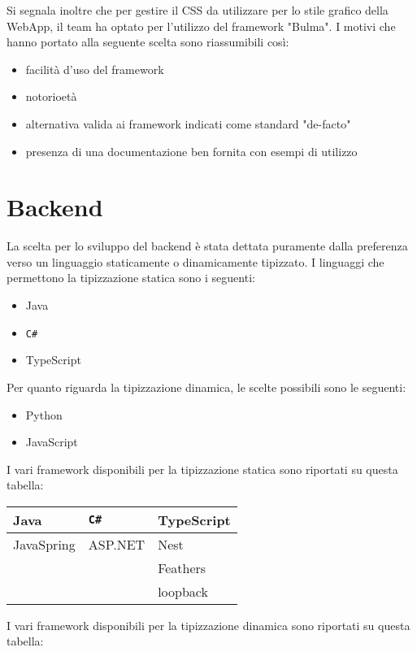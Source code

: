 \documentclass[12pt]{article}
\begin{document}
Si segnala inoltre che per gestire il CSS da utilizzare per lo stile grafico della WebApp, il team ha optato per l'utilizzo del framework "Bulma". I motivi che hanno portato alla seguente scelta sono riassumibili così:
\begin{itemize}
    \item  facilità d'uso del framework
    \item  notorioetà
    \item  alternativa valida ai framework indicati come standard "de-facto"
    \item  presenza di una documentazione ben fornita con esempi di utilizzo
\end{itemize} 
\section{Backend}
La scelta per lo sviluppo del backend è stata dettata puramente dalla preferenza verso un linguaggio staticamente o dinamicamente tipizzato.
I linguaggi che permettono la tipizzazione statica sono i seguenti:
\begin{itemize}
	\item Java
	\item \texttt{C\#}
	\item TypeScript
\end{itemize}
Per quanto riguarda la tipizzazione dinamica, le scelte possibili sono le seguenti:
\begin{itemize}
	\item Python
	\item JavaScript
\end{itemize}

I vari framework disponibili per la tipizzazione statica sono riportati su questa tabella: \\
\begin{center}
\begin{tabular}{ |p{4cm}|p{4cm}| p{4cm} | }
	\hline
	 \textbf{Java} & \texttt{C\#} & \textbf{TypeScript}\\ 
	 \hline
	 JavaSpring & ASP.NET & Nest \\  
	 \hline
 	& & Feathers\\ 
	 \hline
	 & & loopback\\
	 \hline
\end{tabular}
\end{center}

I vari framework disponibili per la tipizzazione dinamica sono riportati su questa tabella: \\
\end{document}
